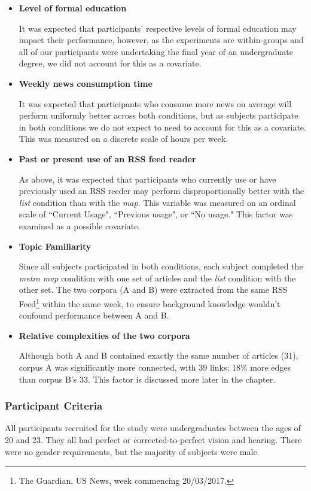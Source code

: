 \begin{itemize}
	\item\textbf{Level of formal education} \par
		It was expected that participants' respective levels of formal education may impact their performance, however, as the experiments are within-groups and all of our participants were undertaking the final year of an undergraduate degree, we did not account for this as a covariate.
	\item\textbf{Weekly news consumption time} \par
		It was expected that participants who consume more news on average will perform uniformly better across both conditions, but as subjects participate in both conditions we do not expect to need to account for this as a covariate. This was measured on a discrete scale of hours per week.
	\item\textbf{Past or present use of an RSS feed reader} \par
		As above, it was expected that participants who currently use or have previously used an RSS reeder may perform disproportionally better with the \textit{list} condition than with the \textit{map}. This variable was measured on an ordinal scale of ``Current Usage", ``Previous usage", or ``No usage." This factor was examined as a possible covariate.
	\item\textbf{Topic Familiarity} \par
		Since all subjects participated in both conditions, each subject completed the \textit{metro map} condition with one set of articles and the \textit{list} condition with the other set. The two corpora (A and B) were extracted from the same RSS Feed\footnote{The Guardian, US News, week commencing 20/03/2017.} within the same week, to ensure background knowledge wouldn't confound performance between A and B.
	\item\textbf{Relative complexities of the two corpora} \par
	Although both A and B contained exactly the same number of articles (31), corpus A was significantly more connected, with 39 links; 18\% more edges than corpus B's 33. This factor is discussed more later in the chapter.
\end{itemize}


\subsubsection{Participant Criteria}
All participants recruited for the study were undergraduates between the ages of 20 and 23. They all had perfect or corrected-to-perfect vision and hearing. There were no gender requirements, but the majority of subjects were male.

